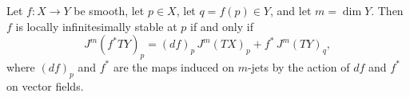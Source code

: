 %

\begin{corollary}
Let $f: X \to Y$ be smooth, let $p \in X$, let $q = f(p) \in Y$, and let $m = \dim Y$.
Then $f$ is locally infinitesimally stable at $p$ if and only if
\[
J^m(f^*TY)_p = (df)_p\, J^m(TX)_p + f^*\, J^m(TY)_q,
\]
where $(df)_p$ and $f^*$ are the maps induced on $m$-jets by the action of $df$ and $f^*$ on vector fields.
\end{corollary}
